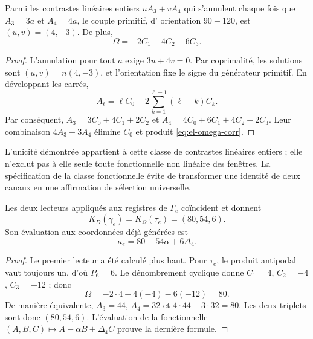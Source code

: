 \begin{lemma}
Parmi les contrastes linéaires entiers \(uA_3+vA_4\) qui s'annulent
chaque fois que \(A_3=3a\) et \(A_4=4a\), le couple primitif, d'
orientation \(90-120\), est \((u,v)=(4,-3)\). De plus,
\begin{equation}
 \Omega=-2C_1-4C_2-6C_3.
 \label{eq:el-omega-corr}
\end{equation}
\end{lemma}
\begin{proof}
L'annulation pour tout \(a\) exige \(3u+4v=0\). Par coprimalité, les solutions sont \((u,v)=n(4,-3)\), et l'orientation fixe le signe du générateur primitif. En développant les carrés,
\[
 A_\ell=\ell C_0+2\sum_{k=1}^{\ell-1}(\ell-k)C_k.
\]
Par conséquent,
\(A_3=3C_0+4C_1+2C_2\) et
\(A_4=4C_0+6C_1+4C_2+2C_3\). Leur combinaison \(4A_3-3A_4\)
élimine \(C_0\) et produit \eqref{eq:el-omega-corr}.
\end{proof}

L'unicité démontrée appartient à cette classe de contrastes linéaires
entiers ; elle n'exclut pas à elle seule toute fonctionnelle non linéaire des fenêtres.
La spécification de la classe fonctionnelle évite de transformer une identité
de deux canaux en une affirmation de sélection universelle.

\begin{theorem}
Les deux lecteurs appliqués aux registres de \(\Gamma_e\) coïncident et donnent
\begin{equation}
 K_D(\gamma_e)=K_\Omega(\tau_e)=(80,54,6).
 \label{eq:el-triple}
\end{equation}
Son évaluation aux coordonnées déjà générées est
\begin{equation}
 \kappa_e=80-54\alpha+6\Delta_4.
 \label{eq:el-kappa}
\end{equation}
\end{theorem}
\begin{proof}
Le premier lecteur a été calculé plus haut. Pour \(\tau_e\), le produit
antipodal vaut toujours un, d'où \(P_6=6\). Le dénombrement cyclique donne
\(C_1=4\), \(C_2=-4\), \(C_3=-12\) ; donc
\[
 \Omega=-2\cdot4-4(-4)-6(-12)=80.
\]
De manière équivalente, \(A_3=44\), \(A_4=32\) et \(4\cdot44-3\cdot32=80\). Les deux triplets sont donc \((80,54,6)\). L'évaluation de la fonctionnelle \((A,B,C)\mapsto A-\alpha B+\Delta_4C\) prouve la dernière formule.
\end{proof}

